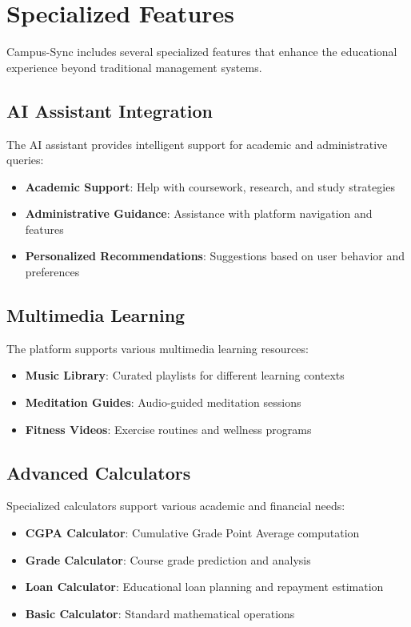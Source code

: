 \section{Specialized Features}

Campus-Sync includes several specialized features that enhance the educational experience beyond traditional management systems.

\subsection{AI Assistant Integration}

The AI assistant provides intelligent support for academic and administrative queries:

\begin{itemize}
    \item \textbf{Academic Support}: Help with coursework, research, and study strategies
    \item \textbf{Administrative Guidance}: Assistance with platform navigation and features
    \item \textbf{Personalized Recommendations}: Suggestions based on user behavior and preferences
\end{itemize}

\subsection{Multimedia Learning}

The platform supports various multimedia learning resources:

\begin{itemize}
    \item \textbf{Music Library}: Curated playlists for different learning contexts
    \item \textbf{Meditation Guides}: Audio-guided meditation sessions
    \item \textbf{Fitness Videos}: Exercise routines and wellness programs
\end{itemize}

\subsection{Advanced Calculators}

Specialized calculators support various academic and financial needs:

\begin{itemize}
    \item \textbf{CGPA Calculator}: Cumulative Grade Point Average computation
    \item \textbf{Grade Calculator}: Course grade prediction and analysis
    \item \textbf{Loan Calculator}: Educational loan planning and repayment estimation
    \item \textbf{Basic Calculator}: Standard mathematical operations
\end{itemize}

